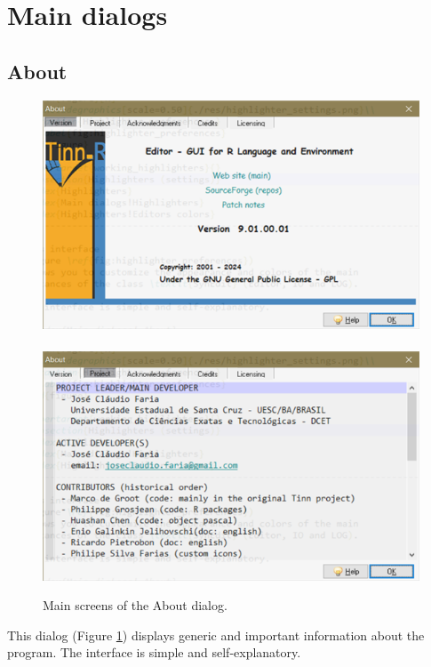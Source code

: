 
\hypertarget{main_dialogs}{}
\section{Main dialogs}

\hypertarget{dlg_working_about}{}
\subsection{About}

\begin{figure}[H]
  \includegraphics[scale=0.50]{./res/dlg_about.png}~~
  \includegraphics[scale=0.50]{./res/dlg_about_project.png} \\
  \caption{Main screens of the About dialog.}
  \label{fig:dlg_about}
\end{figure}
This dialog
(Figure \ref{fig:dlg_about})
displays generic and important information about the program. The interface is
simple and self-explanatory.


